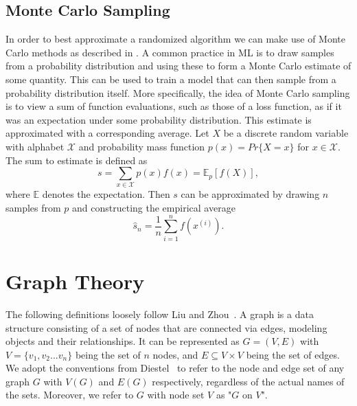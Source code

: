 \subsection{Monte Carlo Sampling}
In order to best approximate a randomized algorithm we can make use of Monte Carlo methods as described in \cite{Goodfellow-et-al-2016}. A common practice in ML is to draw samples from a probability distribution and using these to form a Monte Carlo estimate of some quantity. This can be used to train a model that can then sample from a probability distribution itself. \bigskip
More specifically, the idea of Monte Carlo sampling is to view a sum of function evaluations, such as those of a loss function, as if it was an expectation under some probability distribution. This estimate is approximated with a corresponding average. Let $X$ be a discrete random variable with alphabet $\mathcal{X}$ and probability mass function $p(x)=Pr\{X=x\}$ for $x\in \mathcal{X}$. The sum to estimate is defined as
\begin{equation}
    s = \sum_{x\in \mathcal{X}} p(x)f(x)=\mathbb{E}_p[f(X)],
\end{equation}
where $\mathbb{E}$ denotes the expectation. Then $s$ can be approximated by drawing $n$ samples from $p$ and constructing the empirical average 
\begin{equation}
    \hat{s}_n=\frac{1}{n}\sum_{i=1}^n f(x^{(i)}).
\end{equation}


\section{Graph Theory}
\label{sec:graph_theory}
The following definitions loosely follow Liu and Zhou~\cite{Liu2020}. A graph is a data structure consisting of a set of nodes that are connected via edges, modeling objects and their relationships. It can be represented as $G=(V,E)$ with $V=\{v_1,v_2...v_n\}$ being the set of $n$ nodes, and $E \subseteq V \times V$ being the set of edges. We adopt the conventions from Diestel~\cite{Diestel2017} to refer to the node and edge set of any graph $G$ with $V(G)$ and $E(G)$ respectively, regardless of the actual names of the sets. Moreover, we refer to $G$ with node set $V$ as "$G$ on $V$". \bigskip


